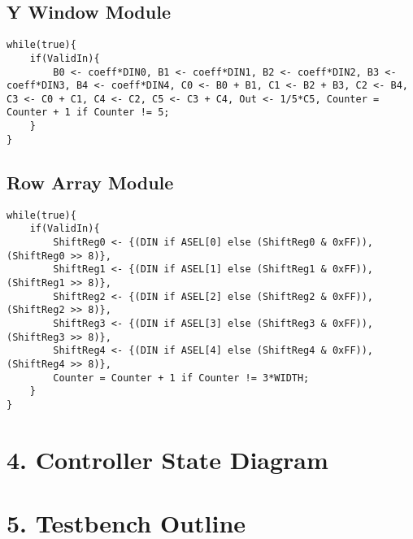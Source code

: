 \documentclass[11pt]{article}
\begin{document}
\subsection*{Y Window Module}
\begin{lstlisting}
while(true){
    if(ValidIn){
        B0 <- coeff*DIN0, B1 <- coeff*DIN1, B2 <- coeff*DIN2, B3 <- coeff*DIN3, B4 <- coeff*DIN4, C0 <- B0 + B1, C1 <- B2 + B3, C2 <- B4, C3 <- C0 + C1, C4 <- C2, C5 <- C3 + C4, Out <- 1/5*C5, Counter = Counter + 1 if Counter != 5;
    }
}
\end{lstlisting}

\subsection*{Row Array Module}

\begin{lstlisting}
while(true){
    if(ValidIn){
        ShiftReg0 <- {(DIN if ASEL[0] else (ShiftReg0 & 0xFF)),  (ShiftReg0 >> 8)},
        ShiftReg1 <- {(DIN if ASEL[1] else (ShiftReg1 & 0xFF)),  (ShiftReg1 >> 8)},
        ShiftReg2 <- {(DIN if ASEL[2] else (ShiftReg2 & 0xFF)),  (ShiftReg2 >> 8)},
        ShiftReg3 <- {(DIN if ASEL[3] else (ShiftReg3 & 0xFF)),  (ShiftReg3 >> 8)},
        ShiftReg4 <- {(DIN if ASEL[4] else (ShiftReg4 & 0xFF)),  (ShiftReg4 >> 8)},
        Counter = Counter + 1 if Counter != 3*WIDTH;
    }
}
\end{lstlisting}

\section*{4. Controller State Diagram}

\section*{5. Testbench Outline}
\end{document}
